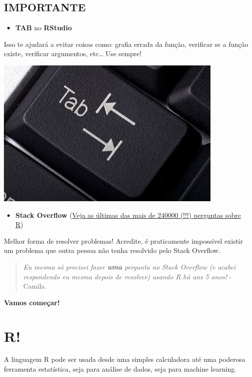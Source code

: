 \documentclass[]{book}
\providecommand{\tightlist}{%
  \setlength{\itemsep}{0pt}\setlength{\parskip}{0pt}}
\theoremstyle{definition}
\theoremstyle{definition}
\theoremstyle{definition}
\theoremstyle{remark}
\begin{document}
\section{IMPORTANTE}\label{importante}

\begin{itemize}
\tightlist
\item
  \textbf{TAB} no \textbf{RStudio}
\end{itemize}

Isso te ajudará a evitar coisas como: grafia errada da função, verificar
se a função existe, verificar argumentos, etc\ldots{} Use sempre!

\includegraphics{figuras/tab-key-.jpeg}

\begin{itemize}
\tightlist
\item
  \textbf{Stack Overflow}
  (\href{https://stackoverflow.com/questions/tagged/r}{Veja as últimas
  das mais de 240000 (!!!) perguntas sobre R})
\end{itemize}

Melhor forma de resolver problemas! Acredite, é praticamente impossível
existir um problema que outra pessoa não tenha resolvido pelo Stack
Overflow.

\begin{quote}
\emph{Eu mesma só precisei fazer \textbf{uma} pergunta no Stack Overflow
(e acabei respondendo eu mesma depois de resolver) usando R há uns 5
anos!} - Camila.
\end{quote}

\textbf{Vamos começar!}

\chapter{R!}\label{r}

A linguagem R pode ser usada desde uma simples calculadora até uma
poderosa ferramenta estatística, seja para análise de dados, seja para
machine learning.
\end{document}
